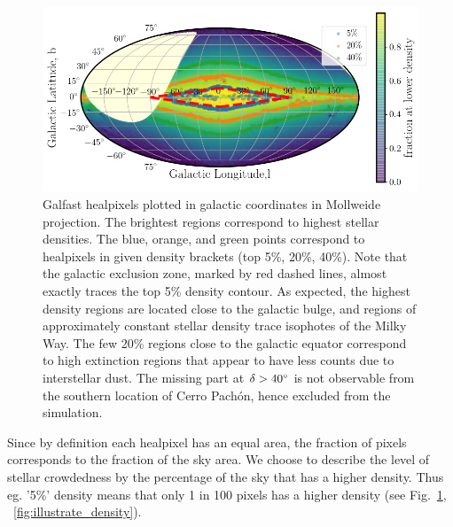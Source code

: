 \documentclass[DM,lsstdraft,toc,usenatbib,authoryear]{lsstdoc}
\begin{document}
\begin{figure}
\includegraphics[width=1.0\columnwidth]{figs/MAF_densities.png}
\caption{Galfast healpixels plotted in galactic coordinates in Mollweide projection. The brightest regions correspond to highest stellar densities. The blue, orange, and green points correspond to healpixels in given density brackets (top 5\%, 20\%, 40\%). Note that the galactic exclusion zone, marked by red dashed lines, almost exactly traces the top 5\% density contour. As expected, the highest density regions are located close to the galactic bulge, and regions of approximately constant stellar density trace isophotes of the Milky Way. The few 20\% regions close to the galactic equator correspond to high extinction regions that appear to have less counts due to interstellar dust. The missing part at  $\delta>40 \degree$  is not observable from the southern location of Cerro Pach\'on, hence excluded from the simulation.  }
\label{fig:MAF_densities}
\end{figure}

Since by definition each healpixel has an equal area, the fraction of pixels  corresponds to the fraction of the sky area. We choose to describe the level of stellar crowdedness by the percentage of the sky that has a higher density. Thus eg.  '5\%' density means that only 1 in 100 pixels has a higher density (see Fig.~\ref{fig:MAF_densities}, ~\ref{fig:illustrate_density}).
\end{document}
